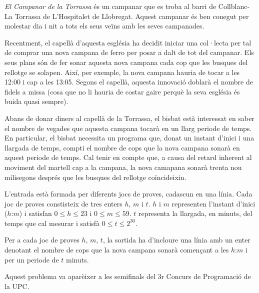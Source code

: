 

\Statement


\emph{El Campanar de la Torrassa} és un campanar que es troba al barri de
Collblanc-La Torrassa de L'Hospitalet de Llobregat. Aquest campanar és ben
conegut per molestar dia i nit a tots els seus veïns amb les seves
campanades.

\medskip Recentment, el capellà d'aquesta església ha decidit iniciar
una col·lecta per tal de comprar una nova campana de ferro per posar
a dalt de tot del campanar. Els seus plans són de fer
sonar aquesta nova campana cada cop que les busques del rellotge se
solapen. Així, per exemple, la nova campana hauria de tocar a les 12:00
i cap a les 13:05. Segons el capellà, aquesta innovació doblarà el nombre de
fidels a missa (cosa que no li hauria de costar gaire perquè la seva església
és buida quasi sempre).

\medskip Abans de donar diners al capellà de la Torrassa, el bisbat
està interessat en saber el nombre de vegades que aquesta campana tocarà 
en un llarg periode de temps. En particular, el bisbat necessita un programa
que, donat un instant d'inici i una llargada de temps, compti el nombre
de cops que la nova campana sonarà en aquest periode de temps.
Cal tenir en compte que, a causa del retard inherent al moviment
del martell cap a la campana, la nova camapana sonarà trenta nou milisegons
després que les busques del rellotge coïncideixin.



\Input

L'entrada està formada per diferents jocs de proves, cadascun en una línia.
Cada joc de proves constisteix de tres enters $h$, $m$ i $t$. $h$ i $m$ 
representen l'instant d'inici 
($h$:$m$) i satisfan $0\le h\le 23$ i $0\le m\le 59$. $t$
representa la llargada, en minuts, del temps que cal mesurar i satisfà
$0\le t \le2^{30}$. 

\Output

Per a cada joc de proves $h$, $m$, $t$, 
la sortida ha d'incloure una línia amb un enter denotant
el nombre de cops que la nova campana sonarà començant a les 
$h$:$m$ i per un periode de $t$ minuts.


\Observation

Aquest problema va aparèixer a les semifinals del 3r Concurs de Programació de
la UPC.
